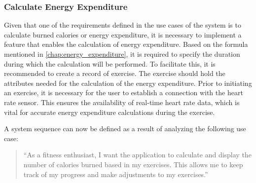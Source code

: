 \subsubsection{Calculate Energy Expenditure}
Given that one of the requirements defined in the use cases of the system is to calculate burned calories or energy expenditure, it is necessary to implement a feature that enables the calculation of energy expenditure. 
Based on the formula mentioned in \autoref{chap:energy_expenditure}, it is required to specify the duration during which the calculation will be performed. 
To facilitate this, it is recommended to create a record of exercise. The exercise should hold the attributes needed for the calculation of the energy expenditure.
Prior to initiating an exercise, it is necessary for the user to establish a connection with the heart rate sensor. This ensures the availability of real-time heart rate data, which is vital for accurate energy expenditure calculations during the exercise.

A system sequence can now be defined as a result of analyzing the following use case:
\begin{quotation}
    \enquote{As a fitness enthusiast, I want the application to calculate and display the number of calories burned based in my exercises. This allows me to keep track of my progress and make adjustments to my exercises.} 
\end{quotation}


